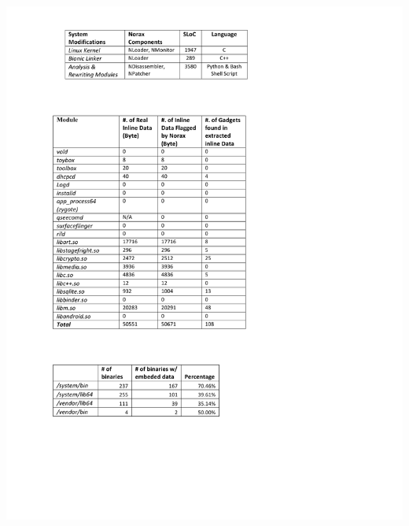 \begin{table}[h]
\begin{minipage}[b]{0.5\textwidth}
\includegraphics[scale=0.76]{norax/figures/rewrite-effect-sec}
	\end{minipage}
\end{table}



%


